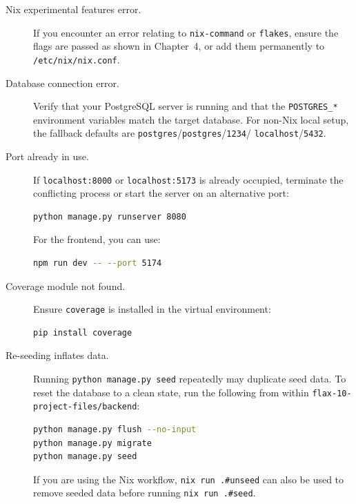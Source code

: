 \documentclass[a4paper, 12pt]{report}
\begin{document}
\begin{description}

    \item[Nix experimental features error.]
    If you encounter an error relating to \texttt{nix-command} or
    \texttt{flakes}, ensure the flags are passed as shown in
    Chapter~4, or add them permanently to \texttt{/etc/nix/nix.conf}.

    \item[Database connection error.]
    Verify that your PostgreSQL server is running and that the
    \texttt{POSTGRES\_*} environment variables match the target
    database. For non-Nix local setup, the fallback defaults are
    \texttt{postgres}/\texttt{postgres}/\texttt{1234}/
    \texttt{localhost}/\texttt{5432}.

    \item[Port already in use.]
    If \texttt{localhost:8000} or \texttt{localhost:5173} is already
    occupied, terminate the conflicting process or start the server
    on an alternative port:
\begin{lstlisting}[language=bash]
python manage.py runserver 8080
\end{lstlisting}

    For the frontend, you can use:
\begin{lstlisting}[language=bash]
npm run dev -- --port 5174
\end{lstlisting}

    \item[Coverage module not found.]
    Ensure \texttt{coverage} is installed in the virtual environment:
\begin{lstlisting}[language=bash]
pip install coverage
\end{lstlisting}

    \item[Re-seeding inflates data.]
    Running \texttt{python manage.py seed} repeatedly may duplicate seed
    data. To reset the database to a clean state, run the following
    from within \texttt{flax-10-project-files/backend}:
\begin{lstlisting}[language=bash]
python manage.py flush --no-input
python manage.py migrate
python manage.py seed
\end{lstlisting}

    If you are using the Nix workflow, \texttt{nix run .\#unseed} can
    also be used to remove seeded data before running
    \texttt{nix run .\#seed}.

\end{description}
\end{document}
